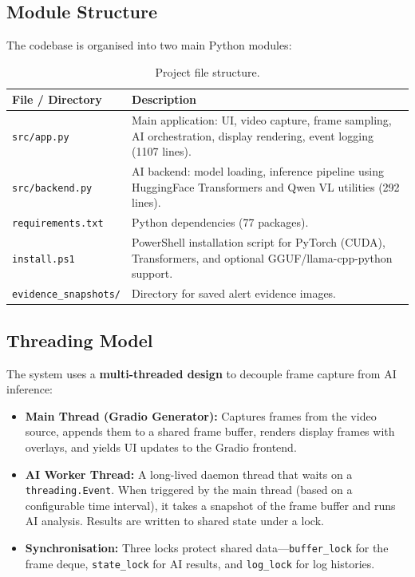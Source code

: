 \documentclass[12pt,a4paper]{article}
\begin{document}
\subsection{Module Structure}

The codebase is organised into two main Python modules:

\begin{table}[H]
\centering
\caption{Project file structure.}
\label{tab:files}
\begin{tabular}{@{}lp{9cm}@{}}
\toprule
\textbf{File / Directory} & \textbf{Description} \\
\midrule
\texttt{src/app.py} & Main application: UI, video capture, frame sampling, AI orchestration, display rendering, event logging (1107 lines). \\
\texttt{src/backend.py} & AI backend: model loading, inference pipeline using HuggingFace Transformers and Qwen VL utilities (292 lines). \\
\texttt{requirements.txt} & Python dependencies (77 packages). \\
\texttt{install.ps1} & PowerShell installation script for PyTorch (CUDA), Transformers, and optional GGUF/llama-cpp-python support. \\
\texttt{evidence\_snapshots/} & Directory for saved alert evidence images. \\
\bottomrule
\end{tabular}
\end{table}

\subsection{Threading Model}

The system uses a \textbf{multi-threaded design} to decouple frame capture from AI inference:

\begin{itemize}
    \item \textbf{Main Thread (Gradio Generator):} Captures frames from the video source, appends them to a shared frame buffer, renders display frames with overlays, and yields UI updates to the Gradio frontend.
    \item \textbf{AI Worker Thread:} A long-lived daemon thread that waits on a \texttt{threading.Event}. When triggered by the main thread (based on a configurable time interval), it takes a snapshot of the frame buffer and runs AI analysis. Results are written to shared state under a lock.
    \item \textbf{Synchronisation:} Three locks protect shared data---\texttt{buffer\_lock} for the frame deque, \texttt{state\_lock} for AI results, and \texttt{log\_lock} for log histories.
\end{itemize}
\end{document}
